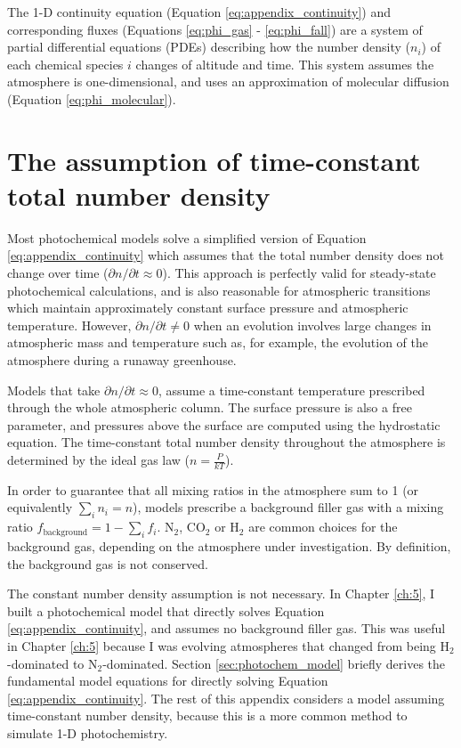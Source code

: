The 1-D continuity equation (Equation \eqref{eq:appendix_continuity}) and corresponding fluxes (Equations \eqref{eq:phi_gas} - \eqref{eq:phi_fall}) are a system of partial differential equations (PDEs) describing how the number density ($n_{i}$) of each chemical species $i$ changes of altitude and time. This system assumes the atmosphere is one-dimensional, and uses an approximation of molecular diffusion (Equation \eqref{eq:phi_molecular}).

\section{The assumption of time-constant total number density} \label{sec:assume_const_num_den}

Most photochemical models solve a simplified version of Equation \eqref{eq:appendix_continuity} which assumes that the total number density does not change over time ($\partial n / \partial t \approx 0$). This approach is perfectly valid for steady-state photochemical calculations, and is also reasonable for atmospheric transitions which maintain approximately constant surface pressure and atmospheric temperature. However, $\partial n / \partial t \neq 0$ when an evolution involves large changes in atmospheric mass and temperature such as, for example, the evolution of the atmosphere during a runaway greenhouse.

Models that take $\partial n / \partial t \approx 0$, assume a time-constant temperature prescribed through the whole atmospheric column. The surface pressure is also a free parameter, and pressures above the surface are computed using the hydrostatic equation. The time-constant total number density throughout the atmosphere is determined by the ideal gas law ($n = \frac{P}{kT}$).

In order to guarantee that all mixing ratios in the atmosphere sum to 1 (or equivalently $\sum_i n_i = n$), models prescribe a background filler gas with a mixing ratio $f_\mathrm{background} = 1 - \sum_i f_i$. N$_2$, CO$_2$ or H$_2$ are common choices for the background gas, depending on the atmosphere under investigation. By definition, the background gas is not conserved.

The constant number density assumption is not necessary. In Chapter \ref{ch:5}, I built a photochemical model that directly solves Equation \eqref{eq:appendix_continuity}, and assumes no background filler gas. This was useful in Chapter \ref{ch:5} because I was evolving atmospheres that changed from being H$_2$-dominated to N$_2$-dominated. Section \ref{sec:photochem_model} briefly derives the fundamental model equations for directly solving Equation \eqref{eq:appendix_continuity}. The rest of this appendix considers a model assuming time-constant number density, because this is a more common method to simulate 1-D photochemistry.

